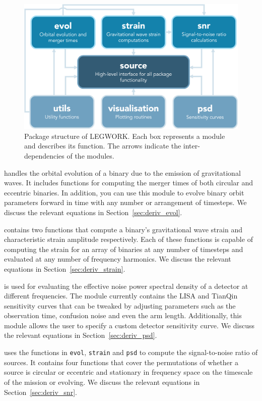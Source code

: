 \documentclass[twocolumn]{aastex631}
\newcommand{\lw}{LEGWORK}
\newcommand{\lwColour}{SeaGreen}
\newcommand{\lwModLink}[1]{\href{https://legwork.readthedocs.io/en/latest/modules.html\#module-legwork.#1}{\color{\lwColour}{\texttt{#1}}}}
\begin{document}
\begin{figure}
    \centering
    \includegraphics[width=\columnwidth]{static/package_overview.png}
    \caption{Package structure of \lw{}. Each box represents a module and describes its function. The arrows indicate the inter-dependencies of the modules.}
    \label{fig:package_overview}
\end{figure}

\lwModLink{evol} handles the orbital evolution of a binary due to the emission of gravitational waves. It includes functions for computing the merger times of both circular and eccentric binaries. In addition, you can use this module to evolve binary orbit parameters forward in time with any number or arrangement of timesteps. We discuss the relevant equations in Section~\ref{sec:deriv_evol}.

\lwModLink{strain} contains two functions that compute a binary's gravitational wave strain and characteristic strain amplitude respectively. Each of these functions is capable of computing the strain for an array of binaries at any number of timesteps and evaluated at any number of frequency harmonics. We discuss the relevant equations in Section~\ref{sec:deriv_strain}.

\lwModLink{psd} is used for evaluating the effective noise power spectral density of a detector at different frequencies. The module currently contains the LISA and TianQin sensitivity curves that can be tweaked by adjusting parameters such as the observation time, confusion noise and even the arm length. Additionally, this module allows the user to specify a custom detector sensitivity curve. We discuss the relevant equations in Section~\ref{sec:deriv_psd}.

\lwModLink{snr} uses the functions in \texttt{evol}, \texttt{strain} and \texttt{psd} to compute the signal-to-noise ratio of sources. It contains four functions that cover the permutations of whether a source is circular or eccentric and stationary in frequency space on the timescale of the mission or evolving. We discuss the relevant equations in Section~\ref{sec:deriv_snr}.
\end{document}

